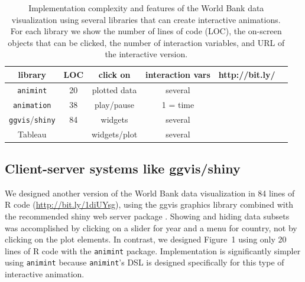 \documentclass[journal]{vgtc}\usepackage[]{graphicx}\usepackage[]{color}
\begin{document}
\begin{table}[t!]
  \caption{Implementation complexity and features
    of the World Bank data visualization
    using several libraries that can create interactive animations.
    For each library
    we show the number of lines of code (LOC), the on-screen objects
    that can be clicked,  the
    number of interaction variables, and URL of the interactive version.
  }
 \label{tab:packages}
 \begin{center}
  \begin{tabular}{cccccc}
    library &
    LOC &
    click on &
    interaction vars &
    http://bit.ly/
    \\
    \hline
    \texttt{animint} &
    20 &
    plotted data &
    several &
    \\
    \texttt{animation} &
    38 &
    play/pause &
    1 = time &
    \\
    \texttt{ggvis}/\texttt{shiny} &
    84 &
    widgets &
    several &
    \\
    Tableau &
      &
    widgets/plot &
    several &
    \\
  \end{tabular}
 \end{center}
\end{table}

\subsection{Client-server systems like ggvis/shiny}

We designed another version of the World Bank data visualization in 84
lines of R code (\url{http://bit.ly/1diUYsg}), using the ggvis
graphics library combined with the recommended shiny web server
package \citep{shiny, ggvis}. Showing and hiding data subsets was
accomplished by clicking on a slider for year and a menu for country,
not by clicking on the plot elements. In contrast, we designed
Figure~1 using only 20 lines of R code with the \texttt{animint} package.
Implementation is significantly simpler using \texttt{animint}
because \texttt{animint}'s DSL is designed specifically for this type of
interactive animation.
\end{document}
